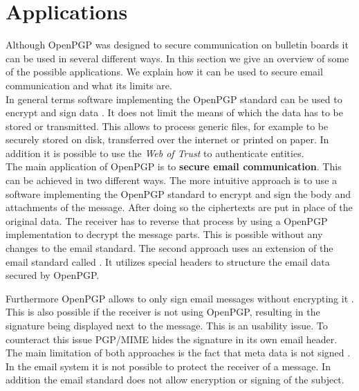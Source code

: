 \section{Applications} \label{section:openpgp:applications}

Although OpenPGP was designed to secure communication on bulletin boards it can be used in several different ways. In this section we give an overview of some of the possible applications. We explain how it can be used to secure email communication and what its limits are.  \\


In general terms software implementing the OpenPGP standard can be used to encrypt and sign data \cite[section 2]{RFC4880}. It does not limit the means of which the data has to be stored or transmitted. This allows to process generic files, for example to be securely stored on disk, transferred over the internet or printed on paper. In addition it is possible to use the \textit{Web of Trust} to authenticate entities. \\  


The main application of OpenPGP is to \textbf{secure email communication}. This can be achieved in two different ways. The more intuitive approach is to use a software implementing the OpenPGP standard to encrypt and sign the body and attachments of the message. After doing so the ciphertexts are put in place of the original data. The receiver has to reverse that process by using a OpenPGP implementation to decrypt the message parts. This is possible without any changes to the email standard. The second approach uses an extension of the email standard called  \citep{RFC3156}. It utilizes special headers to structure the email data secured by OpenPGP.

Furthermore OpenPGP allows to only sign email messages without encrypting it \cite[section 7]{RFC4880}. This is also possible if the receiver is not using OpenPGP, resulting in the signature being displayed next to the message. This is an usability issue. To counteract this issue PGP/MIME hides the signature in its own email header. \\


The main limitation of both approaches is the fact that meta data is not signed \cite{Green2014}. In the email system it is not possible to protect the receiver of a message. In addition the email standard does not allow encryption or signing of the subject. \\

